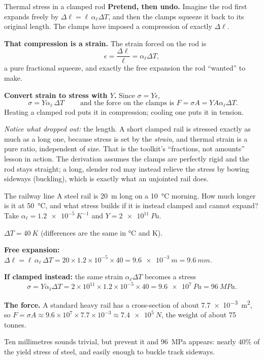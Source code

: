 \begin{derivbox}{Thermal stress in a clamped rod}
 \textbf{Pretend, then undo.} Imagine the rod first expands freely by
$\Delta\ell = \ell\,\alpha_\ell\Delta T$, and then the clamps squeeze it back to its original length.
The clamps have imposed a compression of exactly $\Delta\ell$.

 \textbf{That compression is a strain.} The strain forced on the rod is
\[
\epsilon = \frac{\Delta\ell}{\ell} = \alpha_\ell\Delta T ,
\]
a pure fractional squeeze, and exactly the free expansion the rod ``wanted'' to make.

 \textbf{Convert strain to stress with $Y$.} Since $\sigma = Y\epsilon$,
\[
\boxed{\;\sigma = Y\alpha_\ell\,\Delta T\;}
\qquad\text{and the force on the clamps is } F = \sigma A = YA\alpha_\ell\Delta T .
\]
Heating a clamped rod puts it in compression; cooling one puts it in tension.

 \emph{Notice what dropped out:} the length. A short clamped rail is stressed exactly as much
as a long one, because stress is set by the \emph{strain}, and thermal strain is a pure ratio,
independent of size. That is the toolkit's ``fractions, not amounts'' lesson in action. The derivation
assumes the clamps are perfectly rigid and the rod stays straight; a long, slender rod may instead
relieve the stress by bowing sideways (buckling), which is exactly what an unjointed rail does.
\end{derivbox}

\begin{exbox}{The railway line}\label{ex:rail}
A steel rail is \SI{20}{m} long on a \SI{10}{\celsius} morning. How much longer is it at
\SI{50}{\celsius}, and what stress builds if it is instead clamped and cannot expand? Take
$\alpha_\ell = \SI{1.2e-5}{K^{-1}}$ and $Y = \SI{2e11}{Pa}$.

 $\Delta T = \SI{40}{K}$ (differences are the same in \si{\celsius} and \si{K}).

 \textbf{Free expansion:}
$\Delta\ell = \ell\,\alpha_\ell\,\Delta T = 20 \times 1.2\times10^{-5} \times 40
= \SI{9.6e-3}{m} = \SI{9.6}{mm}$.

 \textbf{If clamped instead:} the same strain $\alpha_\ell\Delta T$ becomes a stress
\[
\sigma = Y\alpha_\ell\Delta T = 2\times10^{11} \times 1.2\times10^{-5}\times 40
= \SI{9.6e7}{Pa} = \SI{96}{MPa}.
\]

 \textbf{The force.} A standard heavy rail has a cross-section of about
\SI{7.7e-3}{m^2}, so $F=\sigma A\approx9.6\times10^{7}\times7.7\times10^{-3}\approx\SI{7.4e5}{N}$,
the weight of about 75 tonnes.

\medskip
Ten millimetres sounds trivial, but prevent it and \SI{96}{MPa} appears: nearly $40\%$ of the yield
stress of steel, and easily enough to buckle track sideways. 
\end{exbox}

